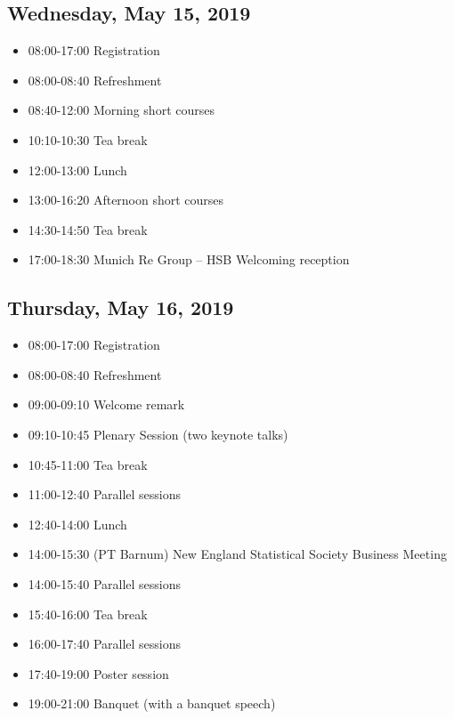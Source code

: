 \documentclass[10pt]{article}
\begin{document}
\begin{large}
\subsection*{Wednesday, May 15, 2019}
\begin{itemize}
\item
  08:00-17:00 \hfill Registration
\item
  08:00-08:40 \hfill Refreshment
\item
  08:40-12:00 \hfill Morning short courses
\item
  10:10-10:30 \hfill Tea break
\item
  12:00-13:00 \hfill Lunch
\item
  13:00-16:20 \hfill Afternoon short courses
\item
  14:30-14:50 \hfill Tea break
\item
  17:00-18:30 \hfill Munich Re Group -- HSB Welcoming reception
\end{itemize}

\vfill
\subsection*{Thursday, May 16, 2019}

\begin{itemize}
\item
  08:00-17:00 \hfill Registration
\item
  08:00-08:40 \hfill Refreshment
\item
  09:00-09:10 \hfill Welcome remark
\item
  09:10-10:45 \hfill Plenary Session (two keynote talks)
\item
  10:45-11:00 \hfill Tea break
\item
  11:00-12:40 \hfill Parallel sessions
\item
  12:40-14:00 \hfill Lunch
\item
  14:00-15:30 (PT Barnum) \hfill New England Statistical Society Business Meeting
\item
  14:00-15:40 \hfill Parallel sessions
\item
  15:40-16:00 \hfill Tea break
\item
  16:00-17:40 \hfill Parallel sessions
\item
  17:40-19:00 \hfill Poster session
\item
  19:00-21:00 \hfill Banquet (with a banquet speech)
\end{itemize}


\end{large}
\end{document}

